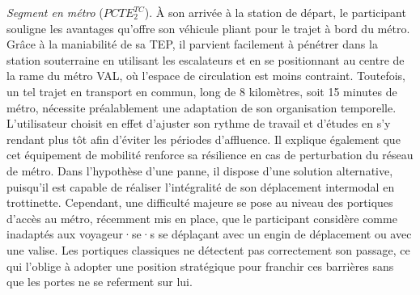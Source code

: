 \begin{refsegment}
\textsl{Segment en métro} (\(PCTE^{TC}_{2}\)). À son arrivée à la station de départ, le participant souligne les avantages qu’offre son véhicule pliant pour le trajet à bord du métro. Grâce à la maniabilité de sa \acrshort{TEP}, il parvient facilement à pénétrer dans la station souterraine en utilisant les escalateurs et en se positionnant au centre de la rame du métro \acrshort{VAL}, où l’espace de circulation est moins contraint. Toutefois, un tel trajet en transport en commun, long de 8 kilomètres, soit 15 minutes de métro, nécessite préalablement une adaptation de son organisation temporelle. L’utilisateur choisit en effet d'ajuster son rythme de travail et d'études en s'y rendant plus tôt afin d’éviter les périodes d’affluence. Il explique également que cet équipement de mobilité renforce sa résilience en cas de perturbation du réseau de métro. Dans l’hypothèse d’une panne, il dispose d’une solution alternative, puisqu’il est capable de réaliser l’intégralité de son déplacement intermodal en trottinette. Cependant, une difficulté majeure se pose au niveau des portiques d’accès au métro, récemment mis en place, que le participant considère comme inadaptés aux voyageur·se·s se déplaçant avec un engin de déplacement ou avec une valise. Les portiques classiques ne détectent pas correctement son passage, ce qui l’oblige à adopter une position stratégique pour franchir ces barrières sans que les portes ne se referment sur lui.%


\end{refsegment}
